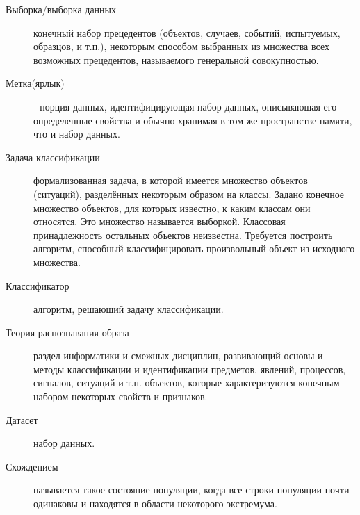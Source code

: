 \Defines %
\begin{description}
	
	\item[Выборка/выборка данных]  конечный набор прецедентов (объектов, случаев, событий, испытуемых, образцов, и т.п.), некоторым способом выбранных из множества всех возможных прецедентов, называемого генеральной совокупностью\cite{def01}.
	\item[Метка(ярлык)]  - порция данных, идентифицирующая набор данных, описывающая его определенные свойства и обычно хранимая в том же пространстве памяти, что и набор данных\cite{def02}.
	
	\item[Задача классификации]{ формализованная задача, в которой имеется множество объектов (ситуаций), разделённых некоторым образом на классы. Задано конечное множество объектов, для которых известно, к каким классам они относятся. Это множество называется выборкой. Классовая принадлежность остальных объектов неизвестна. Требуется построить алгоритм, способный классифицировать  произвольный объект из исходного множества.\cite{def03}}
	\item[Классификатор] {алгоритм, решающий задачу классификации.}
	
	\item[Теория распознавания образа] раздел информатики и смежных дисциплин, развивающий основы и методы классификации и идентификации предметов, явлений, процессов, сигналов, ситуаций и т.п. объектов, которые характеризуются конечным набором некоторых свойств и признаков.

	\item[Датасет]  набор данных.\cite{def03}
	
	\item[Схождением] называется такое состояние популяции, когда все строки популяции почти одинаковы и находятся в области некоторого экстремума. \cite{def05}
	
\end{description}

